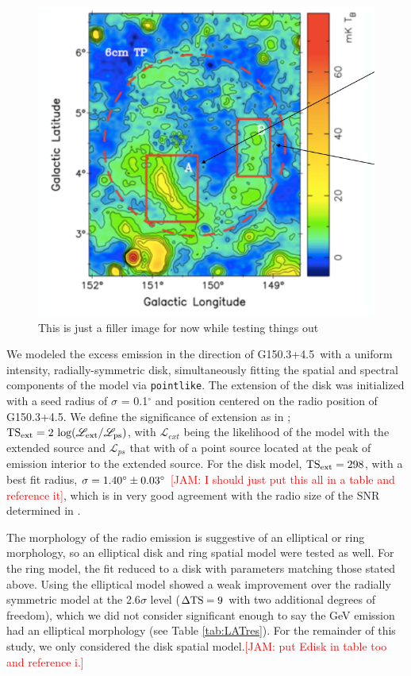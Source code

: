 \documentclass[preprint2]{aastex}
\newcommand{\kibitz}[2]{\ifnum\Comments=1\textcolor{#1}{#2}\fi}
\newcommand{\jamie}[1]{\kibitz{red}      {[JAM: #1]}}
\newcommand{\ptlike}{{\tt pointlike}}
\newcommand{\Gone}{G150.3+4.5}
\begin{document}
\begin{figure}[!ht]
	\begin{centering}
		\includegraphics[width=\columnwidth]{Figures/G150_GaoHan.png}
		\caption{This is just a filler image for now while testing things out \citep{Gao14}
			\label{fig:GaoRad}}
	\end{centering}
\end{figure}

We modeled the excess emission in the direction of \Gone ~with a uniform intensity, radially-symmetric disk, simultaneously fitting the spatial and spectral components of the model  via \ptlike. The extension of the disk was initialized with a seed radius of $\sigma$ = 0.1$^\circ$ and position centered on the radio position of \Gone. We define the significance of extension as in \cite{Lande12}; ${\rm TS_{ext} = 2~log(\mathcal{L}_{ext} / \mathcal{L}_{ps})}$, with $\mathcal{L}_{ext}$ being the likelihood of the model with the extended source and $\mathcal{L}_{ps}$ that with of a point source located at the peak of emission interior to the extended source. For the disk model,  ${\rm TS_{ext} = 298}$, with a best fit radius, ${\rm \sigma = 1.40^\circ \pm 0.03^\circ}$ \jamie{I should just put this all in a table and reference it}, which is in very good agreement with the radio size of the SNR determined in \cite{Gao14}. 

The morphology of the radio emission is suggestive of an elliptical or ring morphology, so an elliptical disk and ring spatial model were tested as well. For the ring model, the fit reduced to a disk with parameters matching those stated above. Using the elliptical model showed a weak improvement over the radially symmetric model at the 2.6$\sigma$ level (${\rm \Delta TS = 9}$ with two additional degrees of freedom), which we did not consider significant enough to say the GeV emission had an elliptical morphology (see Table \ref{tab:LATres}). For the remainder of this study, we only considered the disk spatial model.\jamie{put Edisk in table too and reference i.}
\end{document}
